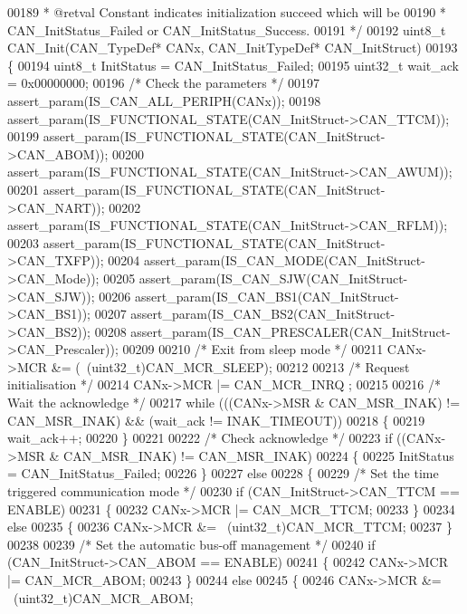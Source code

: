 \begin{DoxyCode}
00189 \textcolor{comment}{  * @retval Constant indicates initialization succeed which will be }
00190 \textcolor{comment}{  *         CAN\_InitStatus\_Failed or CAN\_InitStatus\_Success.}
00191 \textcolor{comment}{  */}
00192 uint8\_t CAN_Init(CAN\_TypeDef* CANx, CAN\_InitTypeDef* CAN\_InitStruct)
00193 \{
00194   uint8\_t InitStatus = CAN_InitStatus_Failed;
00195   uint32\_t wait\_ack = 0x00000000;
00196   \textcolor{comment}{/* Check the parameters */}
00197   assert_param(IS\_CAN\_ALL\_PERIPH(CANx));
00198   assert_param(IS\_FUNCTIONAL\_STATE(CAN\_InitStruct->CAN\_TTCM));
00199   assert_param(IS\_FUNCTIONAL\_STATE(CAN\_InitStruct->CAN\_ABOM));
00200   assert_param(IS\_FUNCTIONAL\_STATE(CAN\_InitStruct->CAN\_AWUM));
00201   assert_param(IS\_FUNCTIONAL\_STATE(CAN\_InitStruct->CAN\_NART));
00202   assert_param(IS\_FUNCTIONAL\_STATE(CAN\_InitStruct->CAN\_RFLM));
00203   assert_param(IS\_FUNCTIONAL\_STATE(CAN\_InitStruct->CAN\_TXFP));
00204   assert_param(IS\_CAN\_MODE(CAN\_InitStruct->CAN\_Mode));
00205   assert_param(IS\_CAN\_SJW(CAN\_InitStruct->CAN\_SJW));
00206   assert_param(IS\_CAN\_BS1(CAN\_InitStruct->CAN\_BS1));
00207   assert_param(IS\_CAN\_BS2(CAN\_InitStruct->CAN\_BS2));
00208   assert_param(IS\_CAN\_PRESCALER(CAN\_InitStruct->CAN\_Prescaler));
00209 
00210   \textcolor{comment}{/* Exit from sleep mode */}
00211   CANx->MCR &= (~(uint32\_t)CAN_MCR_SLEEP);
00212 
00213   \textcolor{comment}{/* Request initialisation */}
00214   CANx->MCR |= CAN_MCR_INRQ ;
00215 
00216   \textcolor{comment}{/* Wait the acknowledge */}
00217   \textcolor{keywordflow}{while} (((CANx->MSR & CAN_MSR_INAK) != CAN_MSR_INAK) && (wait\_ack != 
      INAK_TIMEOUT))
00218   \{
00219     wait\_ack++;
00220   \}
00221 
00222   \textcolor{comment}{/* Check acknowledge */}
00223   \textcolor{keywordflow}{if} ((CANx->MSR & CAN_MSR_INAK) != CAN_MSR_INAK)
00224   \{
00225     InitStatus = CAN_InitStatus_Failed;
00226   \}
00227   \textcolor{keywordflow}{else}
00228   \{
00229     \textcolor{comment}{/* Set the time triggered communication mode */}
00230     \textcolor{keywordflow}{if} (CAN\_InitStruct->CAN\_TTCM == ENABLE)
00231     \{
00232       CANx->MCR |= CAN_MCR_TTCM;
00233     \}
00234     \textcolor{keywordflow}{else}
00235     \{
00236       CANx->MCR &= ~(uint32\_t)CAN_MCR_TTCM;
00237     \}
00238 
00239     \textcolor{comment}{/* Set the automatic bus-off management */}
00240     \textcolor{keywordflow}{if} (CAN\_InitStruct->CAN\_ABOM == ENABLE)
00241     \{
00242       CANx->MCR |= CAN_MCR_ABOM;
00243     \}
00244     \textcolor{keywordflow}{else}
00245     \{
00246       CANx->MCR &= ~(uint32\_t)CAN_MCR_ABOM;

\end{DoxyCode}
